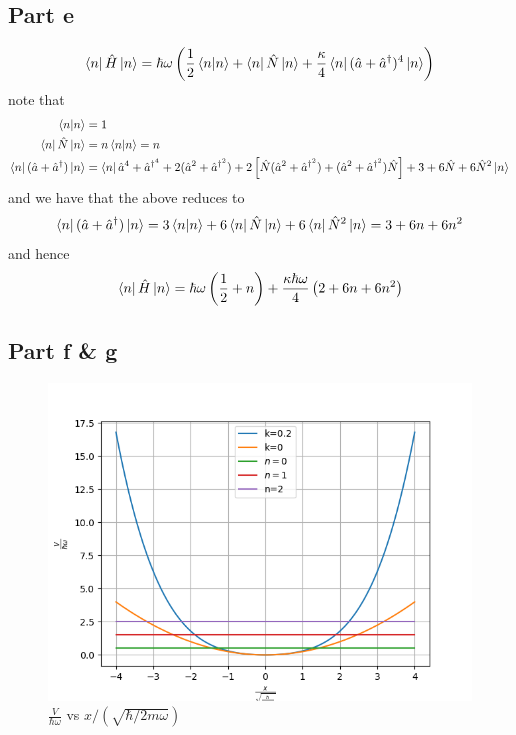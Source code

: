 \documentclass[12pt]{report}
\begin{document}
\subsection*{Part e}
\begin{equation*}
  \bra{n}\hat{H} \ket{n} = \hbar \omega \left(\frac{1}{2} \braket{n|n} + \bra{n}\hat{N}\ket{n} + \frac{\kappa}{4} \bra{n}(\hat{a} + \hat{a}^\dagger)^4 \ket{n}\right)
\end{equation*}
note that
\begin{align*}
  \braket{n|n} &= 1 \\
  \bra{n} \hat{N} \ket{n} &= n \braket{n|n} = n \\
  \bra{n} (\hat{a} + \hat{a}^\dagger) \ket{n} &= \bra{n}\hat{a}^4 + \hat{a}^{\dagger^4} + 2 (\hat{a}^2 + \hat{a}^{\dagger^2}) + 2\left[\hat{N}(\hat{a}^2 + \hat{a}^{\dagger^2}) + (\hat{a}^2 + \hat{a}^{\dagger^2})\hat{N}\right] + 3 + 6\hat{N} + 6\hat{N}^2 \ket{n} 
\end{align*}
and we have that the above reduces to
\begin{equation*}
  \bra{n} (\hat{a} + \hat{a}^\dagger) \ket{n} = 3 \braket{n|n} + 6\bra{n}\hat{N}\ket{n} + 6\bra{n}\hat{N}^2\ket{n} = 3 + 6n + 6n^2
\end{equation*}
and hence
\begin{equation*}
  \bra{n} \hat{H} \ket{n} = \hbar\omega \left(\frac{1}{2} + n\right) + \frac{\kappa \hbar \omega}{4} \left(2 + 6n + 6n^2\right)
\end{equation*}

\subsection*{Part f \& g}
\begin{figure}[H]
  \centering
  \includegraphics[scale=0.8]{hw3q3f.png}
  \caption{$\frac{V}{\hbar \omega}$ vs $x/(\sqrt{\hbar/2m\omega})$}
\end{figure}
\end{document}
